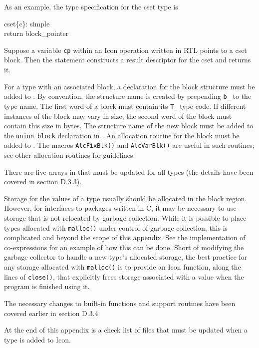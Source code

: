 As an example, the type specification for the cset type is
\begin{iconcode}
cset\{c\}:\>\>\> simple\\
\>\>\>           return block\_pointer
\end{iconcode}

\noindent
Suppose a variable \texttt{cp} within an Icon operation written in RTL
points to a cset block. Then the statement
\noindent
constructs a result descriptor for the cset and returns it.

For a type with an associated block, a declaration for the block
structure must be added to . By convention, the
structure name is created by prepending \texttt{b\_} to the type name.
The first word of a block must contain its \texttt{T\_} type code. If
different instances of the block may vary in size, the second word of
the block must contain this size in bytes. The structure name of the
new block must be added to the \texttt{union block} declaration
in . An allocation routine for the block must be
added to . The macros \texttt{AlcFixBlk()} and
\texttt{AlcVarBlk()} are useful in such routines; see other allocation
routines for guidelines.


There are five arrays in  that must be
updated for all types (the details have been covered in section D.3.3).

Storage for the values of a type usually should be allocated in the
block region. However, for interfaces to packages written in C, it may
be necessary to use storage that is not relocated by garbage
collection. While it is possible to place types allocated with
\texttt{malloc()} under control of garbage collection, this is
complicated and beyond the scope of this appendix. See the
implementation of co-expressions for an example of how this can be
done. Short of modifying the garbage collector to handle a new type's
allocated storage, the best practice for any storage allocated with
\texttt{malloc()} is to provide an Icon function, along the lines of
\texttt{close()}, that explicitly frees storage associated with a
value when the program is finished using it.

The necessary changes to built-in functions and support routines have
been covered earlier in section D.3.4.

At the end of this appendix is a check list of files that must be
updated when a type is added to Icon.

